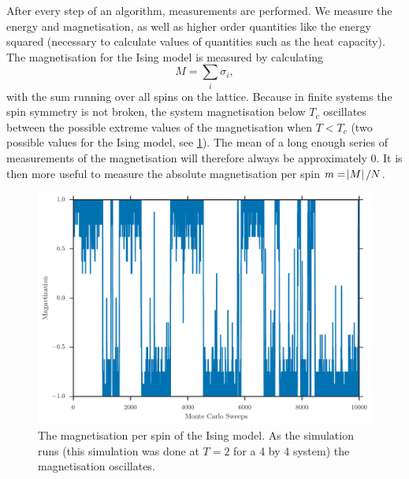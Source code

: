 \documentclass[11pt, a4paper]{report} %
\begin{document}
After every step of an algorithm, measurements are performed.
We measure the energy and magnetisation, as well as higher order quantities like the energy squared (necessary to calculate values of quantities such as the heat capacity).
The magnetisation for the Ising model is measured by calculating
\begin{equation}
	M = \sum_i \sigma_i,
\end{equation}
with the sum running over all spins on the lattice.
Because in finite systems the spin symmetry is not broken, the system magnetisation below \(T_c\) oscillates between the possible extreme values of the magnetisation when \(T<T_c\) (two possible values for the Ising model, see \cref{fig:ising_4by4_magnetization_history}).
The mean of a long enough series of measurements of the magnetisation will therefore always be approximately 0.
It is then more useful to measure the absolute magnetisation per spin \(m = \abs{M} / N\).
\begin{figure}
	\includegraphics[width=\textwidth]{ising_4by4_magnetization_history.pdf}
	\caption{The magnetisation per spin of the Ising model. As the simulation runs (this simulation was done at \(T=2\) for a 4 by 4 system) the magnetisation oscillates.}
	\label{fig:ising_4by4_magnetization_history}
\end{figure}
\end{document}
